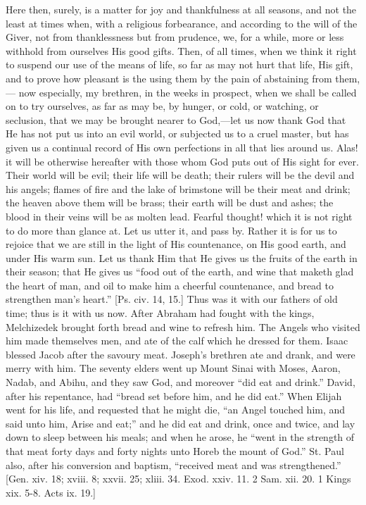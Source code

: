 Here then, surely, is a matter for joy and thankfulness at all
seasons, and not the least at times when, with a religious
forbearance, and according to the will of the Giver, not from
thanklessness but from prudence, we, for a while, more or less
withhold from ourselves His good gifts. Then, of all times, when we
think it right to suspend our use of the means of life, so far as may
not hurt that life, His gift, and to prove how pleasant is the using
them by the pain of abstaining from them,— now especially, my
brethren, in the weeks in prospect, when we shall be called on to try
ourselves, as far as may be, by hunger, or cold, or watching, or
seclusion, that we may be brought nearer to God,—let us now thank
God that He has not put us into an evil world, or subjected us to a
cruel master, but has given us a continual record of His own
perfections in all that lies around us. Alas! it will be otherwise
hereafter with those whom God puts out of His sight for ever. Their
world will be evil; their life will be death; their rulers will be the
devil and his angels; flames of fire and the lake of brimstone will be
their meat and drink; the heaven above them will be brass; their earth
will be dust and ashes; the blood in their veins will be as molten
lead. Fearful thought! which it is not right to do more than glance
at. Let us utter it, and pass by. Rather it is for us to rejoice that
we are still in the light of His countenance, on His good earth, and
under His warm sun. Let us thank Him that He gives us the fruits of
the earth in their season; that He gives us ``food out of the earth, and
wine that maketh glad the heart of man, and oil to make him a cheerful
countenance, and bread to strengthen man's heart.'' [Ps. civ. 14,
15.] Thus was it with our fathers of old time; thus is it with us now.
After Abraham had fought with the kings, Melchizedek brought forth
bread and wine to refresh him. The Angels who visited him made
themselves men, and ate of the calf which he dressed for them. Isaac
blessed Jacob after the savoury meat. Joseph's brethren ate and drank,
and were merry with him. The seventy elders went up Mount Sinai with
Moses, Aaron, Nadab, and Abihu, and they saw God, and moreover
``did eat and drink.'' David, after his repentance, had
``bread set before him, and he did eat.'' When Elijah went for
his life, and requested that he might die, ``an Angel touched him,
and said unto him, Arise and eat;'' and he did eat and drink, once
and twice, and lay down to sleep between his meals; and when he arose,
he ``went in the strength of that meat forty days and forty nights
unto Horeb the mount of God.'' St. Paul also, after his conversion
and baptism, ``received meat and was strengthened.'' [Gen.
xiv. 18; xviii. 8; xxvii. 25; xliii. 34. Exod. xxiv. 11. 2 Sam. xii.
20. 1 Kings xix. 5-8. Acts ix. 19.]


